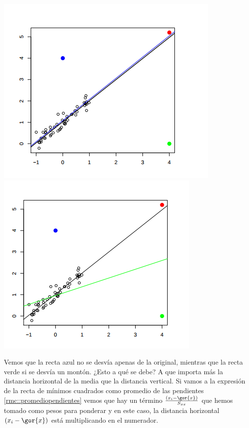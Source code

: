 \begin{example}
\begin{center}
\includegraphics[scale=0.4]{img/sobredistanciahorizontal1.png}
\includegraphics[scale=0.4]{img/sobredistanciahorizontal2.png}
\end{center}

Vemos que la recta azul no se desvía apenas de la original, mientras que la recta verde si se desvía un montón. ¿Esto a qué se debe? A que importa más la distancia horizontal de la media que la distancia vertical. Si vamos a la expresión de la recta de mínimos cuadrados como promedio de las pendientes \ref{rmc::promediopendientes} vemos que hay un término $\frac{(x_i - \gor{x})}{S_{xx}}$ que hemos tomado como pesos para ponderar y en este caso, la distancia horizontal $(x_i - \gor{x})$ está multiplicando en el numerador.



\end{example}





